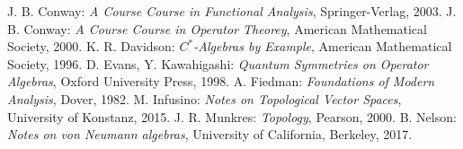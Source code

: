\begin{thebibliography}{99}
	 J. B. Conway: \emph{A Course Course in Functional Analysis}, Springer-Verlag, 2003.
	 J. B. Conway: \emph{A Course Course in Operator Theorey}, American Mathematical Society, 2000.
	 K. R. Davidson: \emph{$C^{*}$-Algebras by Example}, American Mathematical Society, 1996.
	 D. Evans, Y. Kawahigashi: \emph{Quantum Symmetries on Operator Algebras}, Oxford University Press, 1998.
	 A. Fiedman: \emph{Foundations of Modern Analysis}, Dover, 1982.
	 M. Infusino: \emph{Notes on Topological Vector Spaces}, University of Konstanz, 2015.
	 J. R. Munkres: \emph{Topology}, Pearson, 2000.
	 B. Nelson: \emph{Notes on von Neumann algebras}, University of California, Berkeley, 2017.
\end{thebibliography}